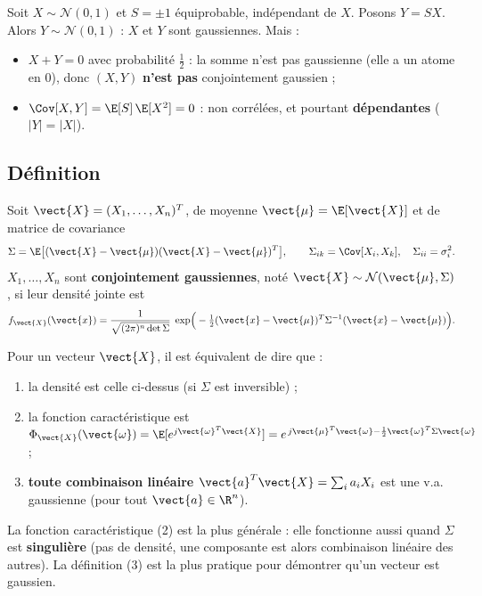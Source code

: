 \documentclass[11pt,a4paper,openany]{book}
\begin{document}
\begin{warnbox}[title={Marginales gaussiennes $\not\Rightarrow$ conjointement gaussiennes}]
Soit $X \sim \mathcal{N}(0,1)$ et $S = \pm1$ équiprobable, indépendant de $X$. Posons $Y = SX$.
Alors $Y\sim\mathcal{N}(0,1)$ : $X$ et $Y$ sont gaussiennes. Mais :
\begin{itemize}
\item $X + Y = 0$ avec probabilité $\frac12$ : la somme n'est pas gaussienne (elle a un
  atome en $0$), donc $(X,Y)$ \textbf{n'est pas} conjointement gaussien ;
\item $\Cov[X,Y] = \E[S]\,\E[X^2] = 0$ : non corrélées, et pourtant \textbf{dépendantes}
  ($|Y| = |X|$).
\end{itemize}
\end{warnbox}

\subsection{Définition}

\begin{defnbox}[title={Vecteur gaussien}]
Soit $\vect{X} = (X_1,\dots,X_n)^T$, de moyenne $\vect{\mu} = \E[\vect{X}]$ et de matrice
de covariance
\[
\Sigma = \E\big[(\vect{X}-\vect{\mu})(\vect{X}-\vect{\mu})^T\big],
\qquad \Sigma_{ik} = \Cov[X_i,X_k], \quad \Sigma_{ii} = \sigma_i^2 .
\]
$X_1,\dots,X_n$ sont \textbf{conjointement gaussiennes}, noté $\vect{X} \sim
\mathcal{N}(\vect{\mu},\Sigma)$, si leur densité jointe est
\[
f_{\vect{X}}(\vect{x}) = \frac{1}{\sqrt{(2\pi)^n \det\Sigma}}\;
\exp\!\Big(-\tfrac12(\vect{x}-\vect{\mu})^T\Sigma^{-1}(\vect{x}-\vect{\mu})\Big).
\]
\end{defnbox}

\begin{propbox}[title={Trois définitions équivalentes}]
Pour un vecteur $\vect{X}$, il est équivalent de dire que :
\begin{enumerate}
\item la densité est celle ci-dessus (si $\Sigma$ est inversible) ;
\item la fonction caractéristique est
  $\Phi_{\vect{X}}(\vect{\omega}) = \E[e^{j\vect{\omega}^T\vect{X}}] =
  e^{\,j\vect{\mu}^T\vect{\omega} - \frac12\vect{\omega}^T\Sigma\vect{\omega}}$ ;
\item \textbf{toute combinaison linéaire} $\vect{a}^T\vect{X} = \sum_i a_iX_i$ est une v.a.
  gaussienne (pour tout $\vect{a}\in\R^n$).
\end{enumerate}
La fonction caractéristique (2) est la plus générale : elle fonctionne aussi quand $\Sigma$ est
\textbf{singulière} (pas de densité, une composante est alors combinaison linéaire des
autres). La définition (3) est la plus pratique pour démontrer qu'un vecteur est gaussien.
\end{propbox}
\end{document}

